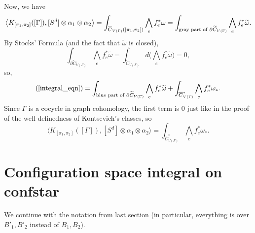 \documentclass[11pt]{article}
\theoremstyle{definition}
\theoremstyle{remark}
\def\wt#1{\widetilde{#1}}
\def\ov#1{\overline{#1}}
\def\tn#1{\textnormal{#1}}
\begin{document}
Now, we have 
\begin{equation}
\label{integral_eqn}
\big\langle K_{[\pi_1,\pi_2]}([\Gamma]), [S^d]\otimes\alpha_1\otimes\alpha_2 \big\rangle=
\int_{\ov{C}_{V(\Gamma)}([\pi_1,\pi_2])}\bigwedge_{e}f_e^*{\omega}=
\int_{\tn{gray part of }\partial\wt{C}_{V(\Gamma)}}\bigwedge_{e}f_e^*\wt{\omega}.
\end{equation}
By Stocks' Formula (and the fact that $\wt\omega$ is closed), 
$$\int_{\partial\wt{C}_{V(\Gamma)}}\bigwedge_{e}f_e^*\wt{\omega}=\int_{\wt{C}_{V(\Gamma)}}d\Big(\bigwedge_{e}f_e^*\wt{\omega}\Big)=0,$$
so, 
$$(\ref{integral_eqn})=\int_{\tn{blue part of }\partial\wt{C}_{V(\Gamma)}}\bigwedge_{e}f_e^*\wt{\omega}+\int_{\ov{C}^*_{V(\Gamma)}}\bigwedge_{e}f_e^*{\omega_*}.$$
Since $\Gamma$ is a cocycle in graph cohomology, the first term is 0 just like in the proof of the well-definedness of Kontsevich's classes, so
$$\big\langle K_{[\pi_1,\pi_2]}([\Gamma]), [S^d]\otimes\alpha_1\otimes\alpha_2 \big\rangle=
\int_{\ov{C}^*_{V(\Gamma)}}\bigwedge_{e}f_e^*{\omega_*}.$$

\section{Configuration space integral on confstar}

We continue with the notation from last section (in particular, everything is over $B'_1, B'_2$ instead of $B_1, B_2$). 
\end{document}
